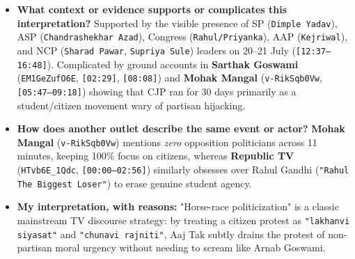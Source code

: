 \documentclass[10pt,a4paper]{article}
\begin{document}
\begin{itemize}[leftmargin=1.5em, itemsep=3pt, topsep=4pt]
  \item \textbf{What context or evidence supports or complicates this interpretation?} Supported by the visible presence of SP (\texttt{Dimple Yadav}), ASP (\texttt{Chandrashekhar Azad}), Congress (\texttt{Rahul/Priyanka}), AAP (\texttt{Kejriwal}), and NCP (\texttt{Sharad Pawar}, \texttt{Supriya Sule}) leaders on 20--21 July (\texttt{[12:37--16:48]}). Complicated by ground accounts in \textbf{Sarthak Goswami} (\texttt{EM1GeZufO6E}, \texttt{[02:29]}, \texttt{[08:08]}) and \textbf{Mohak Mangal} (\texttt{v-RikSqb0Vw}, \texttt{[05:47--09:18]}) showing that CJP ran for 30 days primarily as a student/citizen movement wary of partisan hijacking.
  \item \textbf{How does another outlet describe the same event or actor?} \textbf{Mohak Mangal} (\texttt{v-RikSqb0Vw}) mentions \textit{zero} opposition politicians across 11 minutes, keeping 100\% focus on citizens, whereas \textbf{Republic TV} (\texttt{HTvb6E\_1Qdc}, \texttt{[00:00--02:56]}) similarly obsesses over Rahul Gandhi (\texttt{"Rahul The Biggest Loser"}) to erase genuine student agency.
  \item \textbf{My interpretation, with reasons:} "Horse-race politicization" is a classic mainstream TV discourse strategy: by treating a citizen protest as \texttt{"lakhanvi siyasat"} and \texttt{"chunavi rajniti"}, Aaj Tak subtly drains the protest of non-partisan moral urgency without needing to scream like Arnab Goswami.
\end{itemize}
\end{document}
